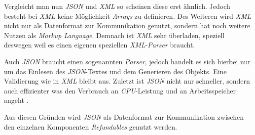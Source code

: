		Vergleicht man nun \textit{JSON} und \textit{XML} so scheinen diese erst ähnlich. Jedoch besteht bei \textit{XML} keine Möglichkeit \textit{Arrays} zu definieren. Des Weiteren wird \textit{XML} nicht nur als Datenformat zur Kommunikation genutzt, sondern hat noch weitere Nutzen als \textit{Markup Language}. Demnach ist \textit{XML} sehr überladen, speziell deswegen weil es einen eigenen speziellen \textit{XML}-\textit{Parser} braucht.
		
		Auch \textit{JSON} braucht einen sogenannten \textit{Parser}, jedoch handelt es sich hierbei nur um das Einlesen des \textit{JSON}-Textes und dem Generieren des Objekts. Eine Validierung wie in \textit{XML} bleibt aus. Zuletzt ist \textit{JSON} nicht nur schneller, sondern auch effizienter was den Verbrauch an \textit{CPU}-Leistung und an Arbeitsspeicher angeht \cite{Nurseitov}.
		
		Aus diesen Gründen wird \textit{JSON} als Datenformat zur Kommunikation zwischen den einzelnen Komponenten \textit{Refundables} genutzt werden.